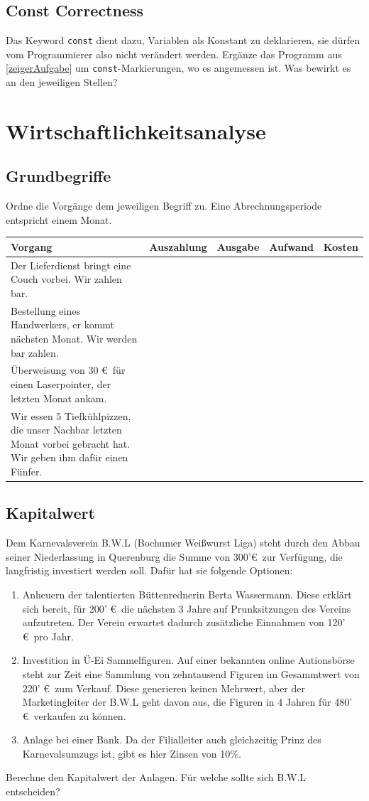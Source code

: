 \documentclass[11pt, a4paper]{article}
\begin{document}
\subsection{Const Correctness}
Das Keyword \texttt{const} dient dazu, Variablen als Konstant zu deklarieren, sie dürfen vom Programmierer also nicht verändert werden. Ergänze das Programm aus \ref{zeigerAufgabe} um \texttt{const}-Markierungen, wo es angemessen ist. Was bewirkt es an den jeweiligen Stellen?

\newpage
\section{Wirtschaftlichkeitsanalyse}
\subsection{Grundbegriffe}
Ordne die Vorgänge dem jeweiligen Begriff zu. Eine Abrechnungsperiode entspricht einem Monat.

\begin{tabularx}{\columnwidth}{X|c|c|c|c}
	Vorgang & Auszahlung & Ausgabe & Aufwand & Kosten \\ \hline
	Der Lieferdienst bringt eine Couch vorbei. Wir zahlen bar. &   &   &  &  \\ \hline
	Bestellung eines Handwerkers, er kommt nächsten Monat. Wir werden bar zahlen. &  &  &  &  \\ \hline
	Überweisung von 30 \euro \ für einen Laserpointer, der letzten Monat ankam. &   &  &  & \\ \hline
	Wir essen 5 Tiefkühlpizzen, die unser Nachbar letzten Monat vorbei gebracht hat. Wir geben ihm dafür einen Fünfer. &   &  &   &  
\end{tabularx}

\subsection{Kapitalwert}
Dem Karnevalsverein B.W.L (Bochumer Weißwurst Liga) steht durch den Abbau seiner Niederlassung in Querenburg die Summe von 300'\euro \ zur Verfügung, die langfristig investiert werden soll. Dafür hat sie folgende Optionen:
\begin{enumerate}
	\item Anheuern der talentierten Büttenrednerin Berta Wassermann. Diese erklärt sich bereit, für 200' \euro \ die nächsten 3 Jahre auf Prunksitzungen des Vereins aufzutreten. Der Verein erwartet dadurch zusätzliche Einnahmen von 120' \euro \ pro Jahr.
	\item Investition in Ü-Ei Sammelfiguren. Auf einer bekannten online Autionsbörse steht zur Zeit eine Sammlung von zehntausend Figuren im Gesammtwert von 220' \euro \ zum Verkauf. Diese generieren keinen Mehrwert, aber der Marketingleiter der B.W.L geht davon aus, die Figuren in 4 Jahren für 480' \euro \ verkaufen zu können.
	\item Anlage bei einer Bank. Da der Filialleiter auch gleichzeitig Prinz des Karnevalsumzugs ist, gibt es hier Zinsen von 10\%.
\end{enumerate}
Berechne den Kapitalwert der Anlagen. Für welche sollte sich B.W.L entscheiden?
\end{document}
